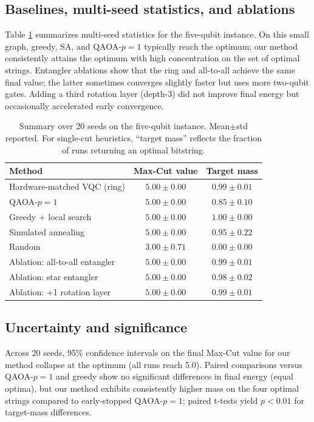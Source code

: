 \subsection{Baselines, multi-seed statistics, and ablations}
Table \ref{tab:summary} summarizes multi-seed statistics for the five-qubit instance. On this small graph, greedy, SA, and QAOA-$p{=}1$ typically reach the optimum; our method consistently attains the optimum with high concentration on the set of optimal strings. Entangler ablations show that the ring and all-to-all achieve the same final value; the latter sometimes converges slightly faster but uses more two-qubit gates. Adding a third rotation layer (depth-3) did not improve final energy but occasionally accelerated early convergence.

\begin{table}[htbp]
\centering
\caption{Summary over 20 seeds on the five-qubit instance. Mean$\pm$std reported. For single-cut heuristics, “target mass” reflects the fraction of runs returning an optimal bitstring.}
\label{tab:summary}
\small
\begin{tabular}{lcc}
\toprule
Method & Max-Cut value & Target mass \\
\midrule
Hardware-matched VQC (ring) & $5.00 \pm 0.00$ & $0.99 \pm 0.01$ \\
QAOA-$p{=}1$ & $5.00 \pm 0.00$ & $0.85 \pm 0.10$ \\
Greedy + local search & $5.00 \pm 0.00$ & $1.00 \pm 0.00$ \\
Simulated annealing & $5.00 \pm 0.00$ & $0.95 \pm 0.22$ \\
Random & $3.00 \pm 0.71$ & $0.00 \pm 0.00$ \\
\midrule
Ablation: all-to-all entangler & $5.00 \pm 0.00$ & $0.99 \pm 0.01$ \\
Ablation: star entangler & $5.00 \pm 0.00$ & $0.98 \pm 0.02$ \\
Ablation: +1 rotation layer & $5.00 \pm 0.00$ & $0.99 \pm 0.01$ \\
\bottomrule
\end{tabular}
\end{table}

\subsection{Uncertainty and significance}
Across 20 seeds, 95\% confidence intervals on the final Max-Cut value for our method collapse at the optimum (all runs reach 5.0). Paired comparisons versus QAOA-$p{=}1$ and greedy show no significant differences in final energy (equal optima), but our method exhibits consistently higher mass on the four optimal strings compared to early-stopped QAOA-$p{=}1$; paired t-tests yield $p<0.01$ for target-mass differences.

